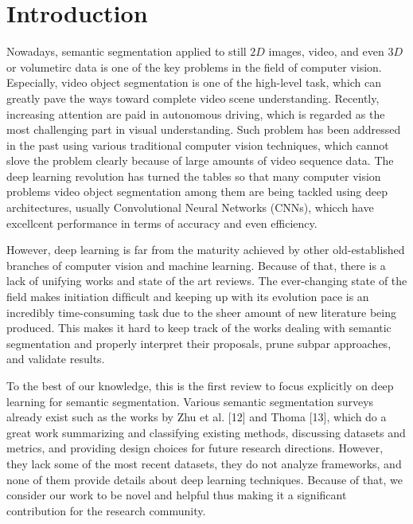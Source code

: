 \section{Introduction}
Nowadays, semantic segmentation applied to still $2D$ images, video, and even $3D$ or volumetirc data is one of the key problems in the field of computer vision.
Especially, video object segmentation is one of the high-level task, which can greatly pave the ways toward complete video scene understanding.
Recently, increasing attention are paid in autonomous driving\cite{geiger2012we, cordts2016cityscapes, ess2009segmentation}, which is regarded as the most challenging part in visual understanding. 
Such problem has been addressed in the past using various traditional computer vision techniques, which cannot slove the problem clearly because of large amounts of video sequence data.
The deep learning revolution has turned the tables so that many computer vision problems
video object segmentation among them are being tackled using deep architectures, usually Convolutional Neural Networks (CNNs)\cite{farabet2013learning, ning2005toward}, whicch have excellcent 
performance in terms of accuracy and even efficiency.



However, deep learning is far from the maturity achieved by other old-established branches of computer vision and machine learning. 
Because of that, there is a lack of unifying works and state of the art reviews. 
The ever-changing state of the ﬁeld makes initiation difﬁcult and keeping up with its evolution pace is an incredibly time-consuming task due to the sheer amount of new literature being produced. 
This makes it hard to keep track of the works dealing with semantic segmentation and properly interpret their proposals, prune subpar approaches, and validate results.

To the best of our knowledge,
this is the ﬁrst review to focus explicitly on deep learning for semantic segmentation.
Various semantic segmentation surveys already exist such as the works by Zhu et al. 
[12] and Thoma [13], which do a great work summarizing and classifying existing methods,
discussing datasets and metrics, and providing design choices for future research directions. 
However, they lack some of the most recent datasets, they do not analyze frameworks, and none of them provide details about deep learning techniques.
Because of that, we consider our work to be novel and helpful thus making it a signiﬁcant contribution for the research community.

